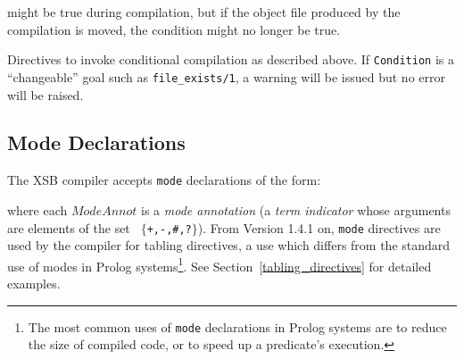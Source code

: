 might be true during compilation, but if the object file produced by
the compilation is moved, the condition might no longer be true.

\begin{description}
%
Directives to invoke conditional compilation as described above.  If
{\tt Condition} is a ``changeable'' goal such as {\tt file\_exists/1},
a warning will be issued but no error will be raised.
\end{description}


%
\subsection{Mode Declarations}\label{mode_declarations}

The XSB compiler accepts {\tt mode} declarations of the form:


\noindent
where each $ModeAnnot$ is a {\em mode annotation\/} (a {\em term
indicator\/} whose arguments are elements of the set {\tt
$\{$+,-,\#,?$\}$}).  From Version 1.4.1 on, {\tt mode} directives are
used by the compiler for tabling directives, a use which differs from
the standard use of modes in Prolog systems\footnote{The most common
uses of {\tt mode} declarations in Prolog systems are to reduce the
size of compiled code, or to speed up a predicate's execution.}.  See
Section~\ref{tabling_directives} for detailed examples.

